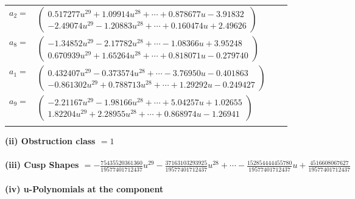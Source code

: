 \documentclass[1p]{elsarticle_modified}
\theoremstyle{definition}
\begin{document}
\begin{tabular}{m{7pt} m{180pt} m{7pt} m{180pt} }
\flushright $a_{2}=$&$\begin{pmatrix}0.517277 u^{29}+1.09914 u^{28}+\cdots+0.878677 u-3.91832\\-2.49074 u^{29}-1.20883 u^{28}+\cdots+0.160474 u+2.49626\end{pmatrix}$ \\
\flushright $a_{8}=$&$\begin{pmatrix}-1.34852 u^{29}-2.17782 u^{28}+\cdots-1.08366 u+3.95248\\0.670939 u^{29}+1.65264 u^{28}+\cdots+0.818071 u-0.279740\end{pmatrix}$ \\
\flushright $a_{1}=$&$\begin{pmatrix}0.432407 u^{29}-0.373574 u^{28}+\cdots-3.76950 u-0.401863\\-0.861302 u^{29}+0.788713 u^{28}+\cdots+1.29292 u-0.249427\end{pmatrix}$ \\
\flushright $a_{9}=$&$\begin{pmatrix}-2.21167 u^{29}-1.98166 u^{28}+\cdots+5.04257 u+1.02655\\1.82204 u^{29}+2.28955 u^{28}+\cdots+0.868974 u-1.26941\end{pmatrix}$\\&\end{tabular}
\flushleft \textbf{(ii) Obstruction class $= 1$}\\~\\
\flushleft \textbf{(iii) Cusp Shapes $= -\frac{75435520361360}{19577401712437} u^{29}-\frac{37163103293925}{19577401712437} u^{28}+\cdots-\frac{152854444455780}{19577401712437} u+\frac{4516608067627}{19577401712437}$}\\~\\
\newpage\renewcommand{\arraystretch}{1}
\flushleft \textbf{(iv) u-Polynomials at the component}\newline \\
\end{document}
